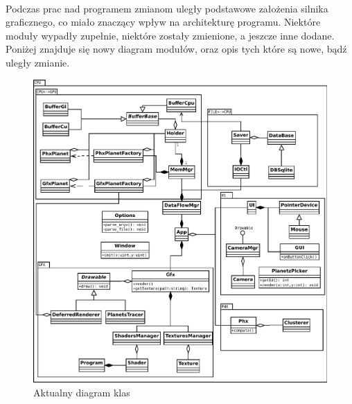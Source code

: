 \paragraph{}

Podczas prac nad programem zmianom uległy podstawowe założenia silnika graficznego, co miało znaczący wpływ na architekturę programu. Niektóre moduły wypadły zupełnie, niektóre zostały zmienione, a jeszcze inne dodane. Poniżej znajduje się nowy diagram modułów, oraz opis tych które są nowe, bądź uległy zmianie.

\begin{figure}[ht!]
\centering
	\includegraphics[width=\textwidth]{img/cpu_classes_revisited.pdf}
\caption{Aktualny diagram klas}
\label{fig:cpudiarev}
\end{figure}

